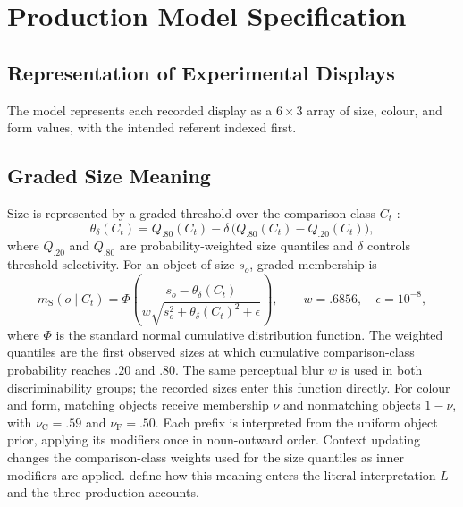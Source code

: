 \documentclass[10pt,a4paper,fleqn]{article}
\begin{document}
\section{Production Model Specification}
\label{sec:appendix:model-specification}

\subsection{Representation of Experimental Displays}

The model represents each recorded display as a $6\times3$ array of size, colour, and form values, with the intended referent indexed first.

\subsection{Graded Size Meaning}

Size is represented by a graded threshold over the comparison class $C_t$ \citep{schmidt2009how,franke2019subjectivity}:
\begin{equation}
  \theta_{\delta}(C_t)
  = Q_{.80}(C_t)
    - \delta\,\bigl(Q_{.80}(C_t)-Q_{.20}(C_t)\bigr),
  \label{eq:size-threshold}
\end{equation}
where $Q_{.20}$ and $Q_{.80}$ are probability-weighted size quantiles and $\delta$ controls threshold selectivity.
For an object of size $s_o$, graded membership is
\begin{equation}
 m_{\mathrm S}(o\mid C_t)
 =\Phi\!\left(\frac{s_o-\theta_\delta(C_t)}
 {w\sqrt{s_o^2+\theta_\delta(C_t)^2+\epsilon}}\right),
 \qquad w=.6856,\quad\epsilon=10^{-8},
 \label{eq:size-membership}
\end{equation}
where $\Phi$ is the standard normal cumulative distribution function.
The weighted quantiles are the first observed sizes at which cumulative comparison-class probability reaches $.20$ and $.80$.
The same perceptual blur $w$ is used in both discriminability groups; the recorded sizes enter this function directly.
For colour and form, matching objects receive membership $\nu$ and nonmatching objects $1-\nu$, with $\nu_{\mathrm C}=.59$ and $\nu_{\mathrm F}=.50$.
Each prefix is interpreted from the uniform object prior, applying its modifiers once in noun-outward order.
Context updating changes the comparison-class weights used for the size quantiles as inner modifiers are applied.
 define how this meaning enters the literal interpretation $L$ and the three production accounts.
\end{document}
